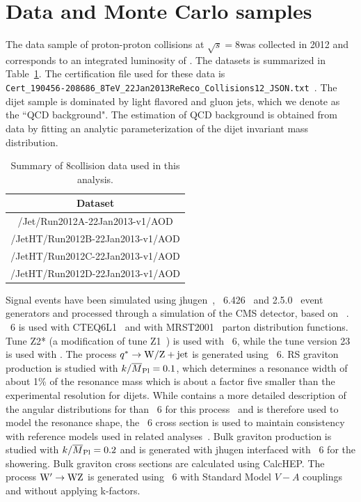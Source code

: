 \newpage
\section{Data and Monte Carlo samples}
\label{sec:data_and_mc_samples1}


The data sample of proton-proton collisions at $\sqrt{s}=8$\TeVcc was collected in 2012 and corresponds to
an integrated luminosity of \intlumi.
The datasets is summarized in Table~\ref{table:dataset}. 
The certification file used for these data is \\
{\tt Cert\_190456-208686\_8TeV\_22Jan2013ReReco\_Collisions12\_JSON.txt
}. The dijet sample is dominated by light flavored and gluon jets, which we denote as 
the ``QCD background".  The estimation of QCD background is obtained from data by fitting an
analytic parameterization of the dijet invariant mass distribution.

\begin{table}[!htb]
\begin{center}
\begin{tabular}{c}
\hline
Dataset                                 \\
\hline
/Jet/Run2012A-22Jan2013-v1/AOD  \\
/JetHT/Run2012B-22Jan2013-v1/AOD  \\
/JetHT/Run2012C-22Jan2013-v1/AOD  \\
/JetHT/Run2012D-22Jan2013-v1/AOD  \\
\hline
\end{tabular} 
\end{center}
\caption{Summary of 8\TeVcc collision data used in this analysis. 
}
\label{table:dataset}
\end{table}



Signal events have been simulated using
{\sc jhugen}~\cite{Gao:2010qx,Bolognesi:2012mm},
\PYTHIA~6.426~\cite{pythia} and \HERWIG{++} 2.5.0~\cite{herwig} event
generators and processed through a simulation of the CMS detector,
based on \GEANTfour~\cite{refGEANT}.  \PYTHIA~6 is used with
CTEQ6L1~\cite{cteq} and \HERWIG{++} with MRST2001~\cite{mrst} parton
distribution functions.  Tune Z2* (a modification of tune
Z1~\cite{bib_tunez1}) is used with \PYTHIA~6, while the tune version
23 is used with \HERWIG{++}.  The process $q^* \to {\rm W}/{\rm Z} +
\text{jet}$ is generated using \PYTHIA~6.  RS graviton production is
studied with $k/\overline{M}_\text{Pl}=0.1$, which determines a resonance width of about
1\% of the resonance mass which is about a factor five smaller than
the experimental resolution for dijets.  While \HERWIG{++} contains a
more detailed description of the angular distributions for \GRS than
\PYTHIA~6 for this process~\cite{resonanceshape} and is therefore used
to model the \GRS resonance shape, the \PYTHIA~6 cross section is used
to maintain consistency with reference models used in related
analyses~\cite{CMSZZPAS2}.  Bulk graviton production is studied with
$k/\overline{M}_\text{Pl}=0.2$ and is generated with {\sc jhugen} interfaced with
\PYTHIA~6 for the showering.
Bulk graviton cross sections are calculated using CalcHEP.
The process $\mathrm{W}^{\prime} \to {\rm W}{\rm Z}$ is generated using \PYTHIA~6 with Standard
Model $V-A$ couplings and without applying k-factors.  

